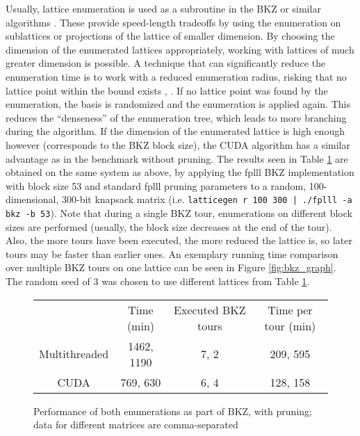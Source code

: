 \documentclass{scrartcl}
\begin{document}
    Usually, lattice enumeration is used as a subroutine in the BKZ or similar algorithms \cite{bkz}. These provide speed-length tradeoffs by using the enumeration on sublattices or projections of the lattice of smaller dimension. By choosing the dimension of the enumerated lattices appropriately, working with lattices of much greater dimension is possible. A technique that can significantly reduce the enumeration time is to work with a reduced enumeration radius, risking that no lattice point within the bound exists \cite{pruning}, \cite{bkz2}. If no lattice point was found by the enumeration, the basis is randomized and the enumeration is applied again. This reduces the ``denseness'' of the enumeration tree, which leads to more branching during the algorithm. If the dimension of the enumerated lattice is high enough however (corresponds to the BKZ block size), the CUDA algorithm has a similar advantage as in the benchmark without pruning. The results seen in Table \ref{tab:pruning_bench} are obtained on the same system as above, by applying the fplll BKZ implementation with block size 53 and standard fplll pruning parameters to a random, 100-dimensional, 300-bit knapsack matrix (i.e. \texttt{latticegen r 100 300 | ./fplll -a bkz -b 53}). 
    Note that during a single BKZ tour, enumerations on different block sizes are performed (usually, the block size decreases at the end of the tour). Also, the more tours have been executed, the more reduced the lattice is, so later tours may be faster than earlier ones. An exemplary running time comparison over multiple BKZ tours on one lattice can be seen in Figure \ref{fig:bkz_graph}. 
    The random seed of 3 was chosen to use different lattices from Table \ref{tab:pruning_bench}.

    \begin{figure}
        \begin{tabular}{c c c c}
            ~ & Time (min) & Executed BKZ tours & Time per tour (min) \\
            Multithreaded & 1462, 1190 & 7, 2 & 209, 595 \\
            CUDA & 769, 630 & 6, 4 & 128, 158
        \end{tabular}
        \caption{Performance of both enumerations as part of BKZ, with pruning; data for different matrices are comma-separated\label{tab:pruning_bench}}
    \end{figure}
\end{document}
